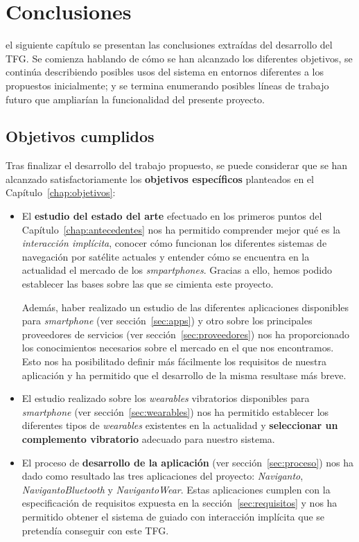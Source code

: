 \chapter{Conclusiones}
\label{chap:conclusiones}

 el siguiente capítulo se presentan las conclusiones extraídas del desarrollo del
\acs{TFG}. Se comienza hablando de cómo se han alcanzado los diferentes objetivos, se continúa
describiendo posibles usos del sistema en entornos diferentes a los propuestos inicialmente; y se
termina enumerando posibles líneas de trabajo futuro que ampliarían la funcionalidad del presente
proyecto.

\section{Objetivos cumplidos}

Tras finalizar el desarrollo del trabajo propuesto, se puede considerar que se han alcanzado
satisfactoriamente los \textbf{objetivos específicos} planteados en el
Capítulo~\ref{chap:objetivos}:

\begin{itemize}
  \item El \textbf{estudio del estado del arte} efectuado en los primeros puntos del
    Capítulo~\ref{chap:antecedentes} nos ha permitido comprender mejor qué es la \emph{interacción
      implícita}, conocer cómo funcionan los diferentes sistemas de navegación por satélite actuales
    y entender cómo se encuentra en la actualidad el mercado de los \emph{smpartphones}. Gracias a
    ello, hemos podido establecer las bases sobre las que se cimienta este proyecto.

    Además, haber realizado un estudio de las diferentes aplicaciones disponibles para
    \emph{smartphone} (ver sección~\ref{sec:apps}) y otro sobre los principales proveedores de
    servicios (ver sección~\ref{sec:proveedores}) nos ha proporcionado los conocimientos necesarios
    sobre el mercado en el que nos encontramos. Esto nos ha posibilitado definir más fácilmente los
    requisitos de nuestra aplicación y ha permitido que el desarrollo de la misma resultase más
    breve.

  \item El estudio realizado sobre los \emph{wearables} vibratorios disponibles para
    \emph{smartphone} (ver sección~\ref{sec:wearables}) nos ha permitido establecer los diferentes
    tipos de \emph{wearables} existentes en la actualidad y \textbf{seleccionar un complemento
      vibratorio} adecuado para nuestro sistema.

  \item El proceso de \textbf{desarrollo de la aplicación} (ver sección~\ref{sec:proceso}) nos ha
    dado como resultado las tres aplicaciones del proyecto: \emph{Naviganto},
    \emph{NavigantoBluetooth} y \emph{NavigantoWear}. Estas aplicaciones cumplen con la
    especificación de requisitos expuesta en la sección~\ref{sec:requisitos} y nos ha permitido
    obtener el sistema de guiado con interacción implícita que se pretendía conseguir con este
    \acs{TFG}.

\end{itemize}

